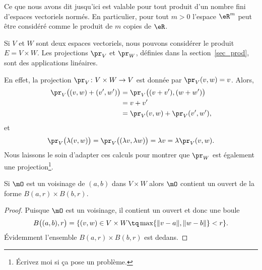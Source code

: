 Ce que nous avons dit jusqu'ici est valable pour tout produit d'un nombre fini d'espaces vectoriels normés. En particulier, pour tout \( m>0\)  l'espace  \( \eR^m\) peut être considéré comme le produit de \( m\) copies de \( \eR\).

\begin{example}
	Si \( V\) et \( W\) sont deux espaces vectoriels, nous pouvons considérer le produit \( E=V\times W\). Les projections \( \pr_V\) et \( \pr_W\), définies dans la section~\ref{sec_prod}, sont des applications linéaires.

	En effet, la projection \( \pr_V\colon V\times W\to V\) est donnée par \( \pr_V(v,w)=v\). Alors,
	\begin{equation}
		\begin{aligned}[]
			\pr_V\big( (v,w)+(v',w') \big) & =\pr_V\big( (v+v'),(w+w') \big) \\
			                               & =v+v'                           \\
			                               & =\pr_V(v,w)+\pr_V(v',w'),
		\end{aligned}
	\end{equation}
	et
	\begin{equation}
		\pr_V\big( \lambda(v,w) \big)=\pr_V\big( (\lambda v,\lambda w) \big)=\lambda v=\lambda\pr_V(v,w).
	\end{equation}
	Nous laissons  le soin d'adapter ces calculs pour montrer que \( \pr_W\) est également une projection\footnote{Écrivez moi si ça pose un problème.}.
\end{example}

\begin{proposition} \label{PropDXR_KbaLC}
	Si \( \mO\) est un voisinage de \( (a,b)\) dans \( V\times W\) alors \( \mO\) contient un ouvert de la forme \( B(a,r)\times B(b,r)\).
\end{proposition}

\begin{proof}
	Puisque \( \mO\) est un voisinage, il contient un ouvert et donc une boule
	\begin{equation}
		B\big( (a,b),r \big)=\{ (v,w)\in V\times W\tq \max\{ \| v-a \|,\| w-b \| \}< r \}.
	\end{equation}
	Évidemment l'ensemble \( B(a,r)\times B(b,r)\) est dedans.
\end{proof}

